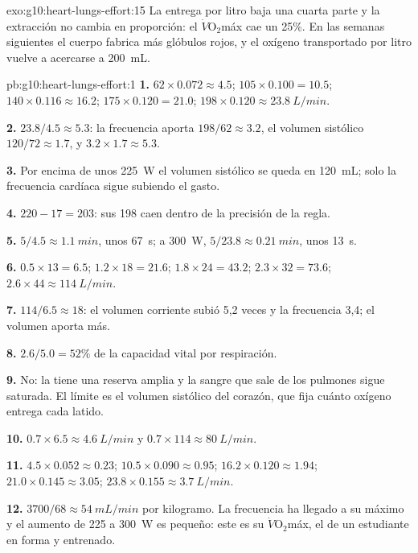 \begin{solution}{exo:g10:heart-lungs-effort:15}
La entrega por litro baja una cuarta parte y la extracción no cambia en
proporción: el $\dot V\!\mathrm{O_2}$máx cae un 25\%. En las semanas
siguientes el cuerpo fabrica más glóbulos rojos, y el oxígeno
transportado por litro vuelve a acercarse a \qty{200}{mL}.
\end{solution}

\begin{solution}{pb:g10:heart-lungs-effort:1}
\textbf{1.} $62 \times 0.072 \approx 4.5$; $105 \times 0.100 = 10.5$;
$140 \times 0.116 \approx 16.2$; $175 \times 0.120 = 21.0$;
$198 \times 0.120 \approx \qty{23.8}{L/min}$.

\textbf{2.} $23.8/4.5 \approx 5.3$: la frecuencia aporta $198/62
\approx 3.2$, el volumen sistólico $120/72 \approx 1.7$, y $3.2 \times
1.7 \approx 5.3$.

\textbf{3.} Por encima de unos \qty{225}{W} el volumen sistólico se
queda en \qty{120}{mL}; solo la frecuencia cardíaca sigue subiendo el
gasto.

\textbf{4.} $220 - 17 = 203$: sus 198 caen dentro de la precisión de la
regla.

\textbf{5.} $5/4.5 \approx \qty{1.1}{min}$, unos \qty{67}{s}; a
\qty{300}{W}, $5/23.8 \approx \qty{0.21}{min}$, unos \qty{13}{s}.

\textbf{6.} $0.5 \times 13 = 6.5$; $1.2 \times 18 = 21.6$; $1.8 \times
24 = 43.2$; $2.3 \times 32 = 73.6$; $2.6 \times 44 \approx
\qty{114}{L/min}$.

\textbf{7.} $114/6.5 \approx 18$: el volumen corriente subió 5,2 veces
y la frecuencia 3,4; el volumen aporta más.

\textbf{8.} $2.6/5.0 = 52\%$ de la capacidad vital por respiración.

\textbf{9.} No: la  tiene una reserva amplia y la sangre que
sale de los pulmones sigue saturada. El límite es el volumen sistólico
del corazón, que fija cuánto oxígeno entrega cada latido.

\textbf{10.} $0.7 \times 6.5 \approx \qty{4.6}{L/min}$ y $0.7 \times
114 \approx \qty{80}{L/min}$.

\textbf{11.} $4.5 \times 0.052 \approx 0.23$; $10.5 \times 0.090
\approx 0.95$; $16.2 \times 0.120 \approx 1.94$; $21.0 \times 0.145
\approx 3.05$; $23.8 \times 0.155 \approx \qty{3.7}{L/min}$.

\textbf{12.} $3700/68 \approx \qty{54}{mL/min}$ por kilogramo. La
frecuencia ha llegado a su máximo y el aumento de 225 a \qty{300}{W} es
pequeño: este es su $\dot V\!\mathrm{O_2}$máx, el de un estudiante en
forma y entrenado.


\end{solution}
